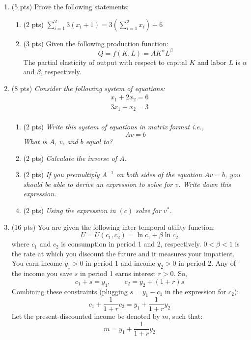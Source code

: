 \documentclass{./../../Latex/tests}
\begin{document}
\begin{enumerate}
\newpage
\item (5 pts) Prove the following statements:
\begin{enumerate}
\item (2 pts)  $ \sum_{i=1}^2 3 (x_i +1) = 3 \left(\sum_{i=1}^2 x_i \right)+ 6 $
\vspace{5cm}

\item (3 pts)  Given the following production function: 
$$ Q = f(K, L) = A K^{\alpha} L^{\beta} $$
The partial elasticity of output with respect to capital $K$ and labor $L$ is $\alpha$ and $\beta$, respectively. 


\end{enumerate} 

\vspace{1cm}

\newpage
\item (8 pts) \textit{Consider the following system of equations:
}\begin{align*}
x_1 + 2 x_2 = 6 \\
3 x_1 + x_2 = 3 \\
\end{align*}
\begin{enumerate}
\item (2 pts) \textit{Write this system of equations in matrix format i.e., $$ Av=b $$
What is $A$, $v$, and $b$ equal to?} 
\vspace{5.5cm}
\item (2 pts) \textit{Calculate the inverse of $A$. } 
\newpage \item (2 pts) \textit{If you premultiply $A^{-1}$ on both sides of the equation $ Av=b $, you should be able to derive an expression to solve for $v$. Write down this expression. } \\
\vspace{5.5cm}
\item (2 pts) \textit{Using the expression in $(c)$ solve for $v^*$. } 
\vspace{5cm}
\end{enumerate}

\newpage
\item (16 pts) You are given the following inter-temporal utility function:
$$ U = U(c_1, c_2) =  \ln c_1 + \beta \ln c_2 $$
where $c_1$ and $c_2$ is consumption in period 1 and 2, respectively. $0<\beta<1$ is the rate at which you discount the future and it measures your impatient. You earn income $y_1>0$ in period 1 and income $y_2>0$ in period 2. Any of the income you save $s$ in period 1 earns interest $r>0$. So, $$ c_1 + s = y_1, \quad \quad c_2 = y_2 + (1+r) s $$
Combining these constraints (plugging $s=y_1-c_1$ in the expression for $c_2$):
$$ c_1 + \frac{1}{1+r} c_2 = y_1 + \frac{1}{1+r} y_2 $$
Let the present-discounted income be denoted by $m$, such that:
$$ m = y_1 + \frac{1}{1+r} y_2 $$


\end{enumerate}
\end{document}
